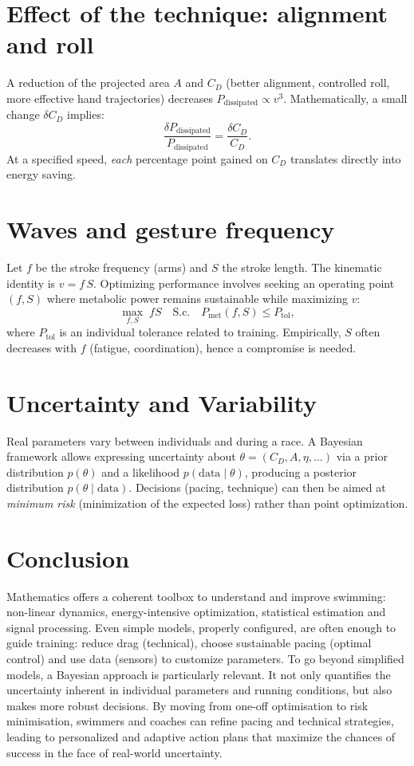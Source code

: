 \documentclass[12pt,a4paper]{article}
\begin{document}
\section{Effect of the technique: alignment and roll}
A reduction of the projected area $A$ and $C_D$ (better alignment, controlled roll, more effective hand trajectories) decreases $P_{\mathrm{dissipated}}\propto v^3$. Mathematically, a small change $\delta C_D$ implies:
\begin{equation}
 \frac{\delta P_{\mathrm{dissipated}}}{P_{\mathrm{dissipated}}} = \frac{\delta C_D}{C_D}.
 \end{equation}
At a specified speed, \emph{each} percentage point gained on $C_D$ translates directly into energy saving.

\section{Waves and gesture frequency}
Let $f$ be the stroke frequency (arms) and $S$ the stroke length. The kinematic identity is $v=f\,S$. Optimizing performance involves seeking an operating point $(f,S)$ where metabolic power remains sustainable while maximizing $v$:
\begin{equation}
 \max_{f,S}\; fS \quad \text{S.c.}\quad P_{\mathrm{met}}(f,S)\le P_{\mathrm{tol}},
 \end{equation}
where $P_{\mathrm{tol}}$ is an individual tolerance related to training. Empirically, $S$ often decreases with $f$ (fatigue, coordination), hence a compromise is needed.

\section{Uncertainty and Variability}
Real parameters vary between individuals and during a race. A Bayesian framework allows expressing uncertainty about $\theta=(C_D,A,\eta,\ldots)$ via a prior distribution $p(\theta)$ and a likelihood $p(\text{data}\mid\theta)$, producing a posterior distribution $p(\theta\mid\text{data})$. Decisions (pacing, technique) can then be aimed at \emph{minimum risk} (minimization of the expected loss) rather than point optimization.

\section{Conclusion}
Mathematics offers a coherent toolbox to understand and improve swimming: non-linear dynamics, energy-intensive optimization, statistical estimation and signal processing. Even simple models, properly configured, are often enough to guide training: reduce drag (technical), choose sustainable pacing (optimal control) and use data (sensors) to customize parameters. To go beyond simplified models, a Bayesian approach is particularly relevant. It not only quantifies the uncertainty inherent in individual parameters and running conditions, but also makes more robust decisions. By moving from one-off optimisation to risk minimisation, swimmers and coaches can refine pacing and technical strategies, leading to personalized and adaptive action plans that maximize the chances of success in the face of real-world uncertainty.
\end{document}
